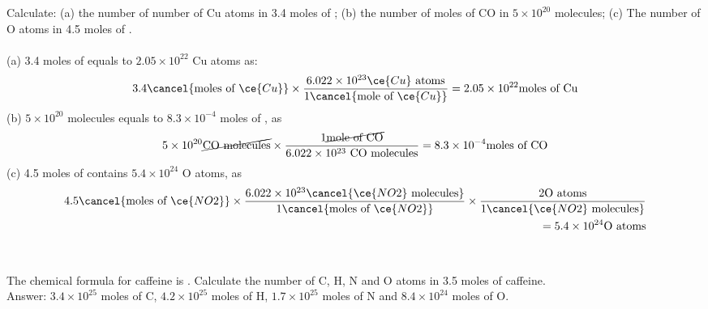 \documentclass[main.tex]{subfiles}
\begin{document}
\begin{description}
	
\begin{example} %
Calculate: (a) the number of number of Cu atoms in 3.4 moles of ; (b) the number of moles of CO in $5\times 10^{20}$  molecules; (c) The number of O atoms in 4.5 moles of . \\
\\
(a) 3.4 moles of  equals to $2.05\times 10^{22}$ Cu atoms as:
\begin{equation*}
3.4   \cancel{\text{moles of }\ce{Cu}} \times
\dfrac{6.022\times 10^{23} \ce{Cu} \text{ atoms}  } {  1\cancel{\text{mole of  }\ce{Cu}}}=2.05\times 10^{22} \text{moles of Cu}
\end{equation*}
(b) $5\times 10^{20}$  molecules equals to $8.3\times 10^{-4}$ moles of  , as
\begin{equation*}
5\times 10^{20}   \cancel{\text{CO molecules}} \times
\dfrac{ 1\cancel{\text{mole of CO}}  } { 6.022\times 10^{23} \text{ CO molecules}    }
=8.3\times 10^{-4} \text{moles of CO}
\end{equation*}
(c) 4.5 moles of  contains $5.4\times 10^{24}$ O atoms, as
 \begin{equation*}\begin{split}
4.5  \cancel{\text{moles of }\ce{NO2}} \times 
\dfrac{6.022\times 10^{23} \cancel{\ce{NO2} \text{ molecules}}  } {  1\cancel{\text{moles of }\ce{NO2}}} 
\times\dfrac{2 \text{O atoms}}{1\cancel{\ce{NO2} \text{ molecules}}}\\
=5.4\times 10^{24}\text{O atoms}
\end{split}\end{equation*}\\
\faDiamond\ \\
The chemical formula for caffeine is . Calculate the number of C, H, N and O atoms in 3.5 moles of caffeine. \\
\flushright Answer: $3.4\times 10^{25}$ moles of C, $4.2\times 10^{25}$ moles of H, $1.7\times 10^{25}$ moles of N and $8.4\times 10^{24}$ moles of O.
\end{example}%


\end{description}
	
\end{document}
